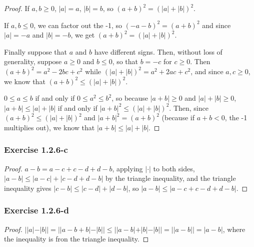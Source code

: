 \documentclass{article}
\begin{document}
\begin{proof}
If $a, b \geq 0$, $|a| = a$, $|b| = b$, so $(a + b)^2 = (|a| + |b|)^2$.

If $a, b \leq 0$, we can factor out the -1, so $(-a -b)^2 = (a + b)^2$ and since $|a| = -a$ and $|b| = -b$, we get $(a + b)^2 = (|a| + |b|)^2$.

Finally suppose that $a$ and $b$ have different signs. Then, without loss of generality, suppose $a \geq 0$ and $b \leq 0$, so that $b = -c$ for $c \geq 0$.
Then $(a + b)^2 = a^2 -2bc + c^2$ while $(|a| + |b|)^2 = a^2 + 2ac + c^2$, and since $a, c \geq 0$, we know that $(a + b)^2 \leq (|a| + |b|)^2$.

$0 \leq a \leq b$ if and only if $0 \leq a^2 \leq b^2$, so because $|a + b| \geq 0$ and $|a| + |b| \geq 0$,
$|a + b| \leq |a| + |b|$ if and only if $|a + b|^2 \leq (|a| + |b|)^2$.
Then, since $(a + b)^2 \leq (|a| + |b|)^2$ and $|a + b|^2 = (a + b)^2$ (because if $a + b < 0$, the -1 multiplies out), we know that $|a + b| \leq |a| + |b|$.

\end{proof}

\subsubsection*{Exercise 1.2.6-c}

\begin{proof}
$a - b = a - c + c - d + d - b$, applying $|\cdot|$ to both sides, $|a - b| \leq |a - c| + |c - d + d - b|$ by the triangle inequality, and the triangle
inequality gives $|c - b| \leq |c - d| + |d - b|$, so $|a - b| \leq |a - c + c - d + d - b|$.
\end{proof}

\subsubsection*{Exercise 1.2.6-d}

\begin{proof}
$||a| - |b|| = ||a - b + b| - |b|| \leq ||a - b| + |b| - |b|| = ||a - b|| = |a - b|$, where the inequality is fron the triangle inequality.
\end{proof}
\end{document}
